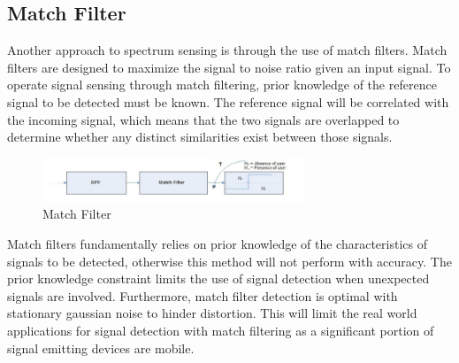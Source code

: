 \subsection{Match Filter}
Another approach to spectrum sensing is through the use of match filters. Match filters are designed to maximize the signal to noise ratio given an input signal. To operate signal sensing through match filtering, prior knowledge of the reference signal to be detected must be known. The reference signal will be correlated with the incoming signal, which means that the two signals are overlapped to determine whether any distinct similarities exist between those signals.
\begin{figure}[ht]
\centering
\includegraphics[width=0.70\textwidth]{img/match_filter.png}
\caption{Match Filter}
\label{fig:match_filter}
\end{figure}\par
Match filters fundamentally relies on prior knowledge of the characteristics of signals to be detected, otherwise this method will not perform with accuracy. The prior knowledge constraint limits the use of signal detection when unexpected signals are involved. Furthermore, match filter detection is optimal with stationary gaussian noise to hinder distortion. This will limit the real world applications for signal detection with match filtering as a significant portion of signal emitting devices are mobile.

